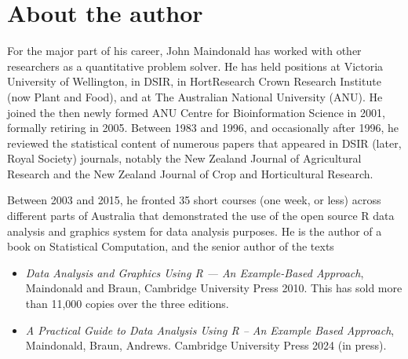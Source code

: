 \documentclass[
  10ptls,
  b5paper]{book}
\providecommand{\tightlist}{%
  \setlength{\itemsep}{0pt}\setlength{\parskip}{0pt}}
\begin{document}
\thispagestyle{empty}

\hypertarget{author}{%
\chapter*{About the author}\label{author}}

For the major part of his career, John Maindonald has worked with other
researchers as a quantitative problem solver.
He has held positions at Victoria University of Wellington, in DSIR, in HortResearch Crown Research Institute (now Plant and Food), and at The Australian National University (ANU).
He joined the then newly formed ANU Centre for Bioinformation Science in 2001, formally retiring in 2005.
Between 1983 and 1996, and occasionally after 1996, he reviewed the statistical content of numerous papers that appeared in DSIR (later, Royal Society) journals, notably the New Zealand Journal of Agricultural Research and the New Zealand Journal of Crop and Horticultural Research.

Between 2003 and 2015, he fronted 35 short courses (one week, or less)
across different parts of Australia that demonstrated the use of the open source R data analysis and graphics system for data analysis purposes.
He is the author of a book on Statistical Computation, and the senior author of
the texts

\begin{itemize}
\tightlist
\item
  \emph{Data Analysis and Graphics Using R --- An Example-Based Approach}, Maindonald and Braun, Cambridge University Press 2010.
  This has sold more than 11,000 copies over the three editions.\\
\item
  \emph{A Practical Guide to Data Analysis Using R -- An Example Based Approach},
  Maindonald, Braun, Andrews. Cambridge University Press 2024 (in press).
\end{itemize}
\end{document}
